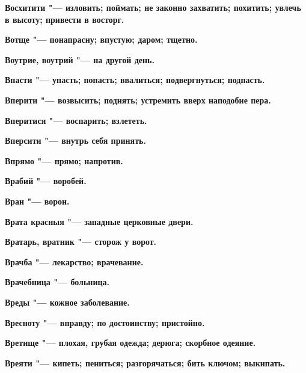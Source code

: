 \begin{mymulticols}{2}
\bfseries Восхитити\normalfont{} "--- изловить; поймать; не законно захватить; похитить; увлечь в высоту; привести в восторг. 




\bfseries Вотще\normalfont{} "--- понапрасну; впустую; даром; тщетно. 




\bfseries Воутрие, воутрий\normalfont{} "--- на другой день. 




\bfseries Впасти\normalfont{} "--- упасть; попасть; ввалиться; подвергнуться; подпасть. 




\bfseries Вперити\normalfont{} "--- возвысить; поднять; устремить вверх наподобие пера. 




\bfseries Вперитися\normalfont{} "--- воспарить; взлететь. 




\bfseries Вперсити\normalfont{} "--- внутрь себя принять. 




\bfseries Впрямо\normalfont{} "--- прямо; напротив. 




\bfseries Врабий\normalfont{} "--- воробей. 




\bfseries Вран\normalfont{} "--- ворон. 




\bfseries Врата красныя\normalfont{} "--- западные церковные двери. 




\bfseries Вратарь, вратник\normalfont{} "--- сторож у ворот. 




\bfseries Врачба\normalfont{} "--- лекарство; врачевание. 




\bfseries Врачебница\normalfont{} "--- больница. 




\bfseries Вреды\normalfont{} "--- кожное заболевание. 




\bfseries Вресноту\normalfont{} "--- вправду; по достоинству; пристойно. 




\bfseries Вретище\normalfont{} "--- плохая, грубая одежда; дерюга; скорбное одеяние. 




\bfseries Вреяти\normalfont{} "--- кипеть; пениться; разгорячаться; бить ключом; выкипать. 





\end{mymulticols}
